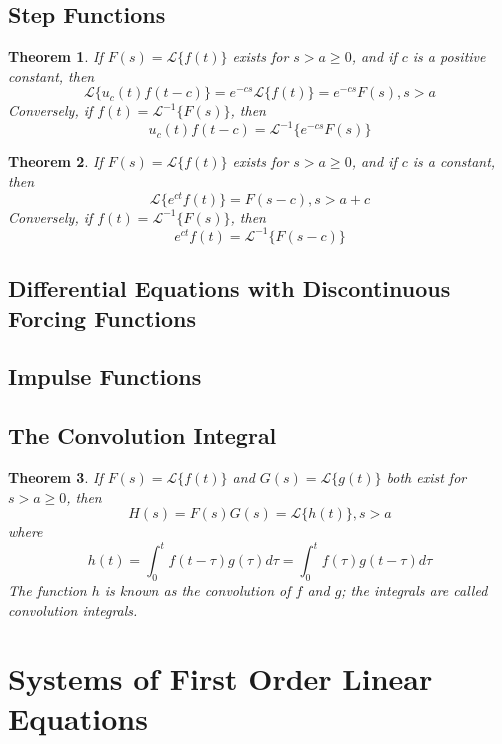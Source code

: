 \documentclass[10pt]{report}
\newtheorem{thm3}{Theorem}[subsection]
\begin{document}
\subsection{Step Functions}
\begin{thm3}
If $F(s)=\mathcal{L}\{f(t)\}$ exists for $s>a\geq 0$, and if $c$ is a positive constant, then
$$\mathcal{L}\{u_c(t)f(t-c)\} = e^{-cs}\mathcal{L}\{f(t)\} = e^{-cs}F(s), s>a$$
Conversely, if $f(t)=\mathcal{L}^{-1}\{F(s)\}$, then
$$u_c(t)f(t-c)=\mathcal{L}^{-1}\{e^{-cs}F(s)\}$$
\end{thm3}
\begin{thm3}
If $F(s)=\mathcal{L}\{f(t)\}$ exists for $s>a\geq 0$, and if $c$ is a constant, then
$$\mathcal{L}\{e^{ct}f(t)\}=F(s-c), s>a+c$$
Conversely, if $f(t)=\mathcal{L}^{-1}\{F(s)\}$, then
$$e^{ct}f(t)=\mathcal{L}^{-1}\{F(s-c)\}$$
\end{thm3}
\subsection{Differential Equations with Discontinuous Forcing Functions}
\subsection{Impulse Functions}
\subsection{The Convolution Integral}
\begin{thm3}
If $F(s) = \mathcal{L}\{f(t)\}$ and $G(s)=\mathcal{L}\{g(t)\}$ both exist for $s>a\geq 0$, then
$$H(s) = F(s)G(s)=\mathcal{L}\{h(t)\}, s>a$$
where
$$h(t)=\int_0^t f(t-\tau)g(\tau)d\tau =\int_0^t f(\tau)g(t-\tau)d\tau$$
The function $h$ is known as the convolution of $f$ and $g$; the integrals are called convolution integrals.
\end{thm3}
\section{Systems of First Order Linear Equations}
\end{document}
